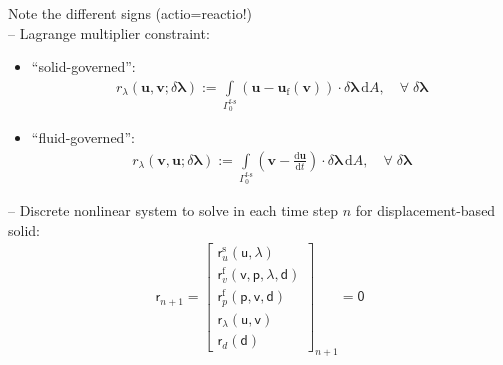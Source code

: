 \documentclass[a4paper,12pt]{report}
\newcommand{\fS}{\text{s}}
\newcommand{\fF}{\text{f}}
\newcommand{\bs}[1]{\boldsymbol{#1}}
\newcommand{\Gm}{\mathit{\Gamma}}
\newcommand{\ROP}{\bs{\mathsf{r}}}
\newcommand{\LM}{\bs{\mathsf{\lambda}}}
\begin{document}
Note the different signs (actio=reactio!)\\

-- Lagrange multiplier constraint:

\begin{itemize}

\item ``solid-governed'':
\begin{equation}
\begin{aligned}
r_{\lambda}(\bs{u},\bs{v};\delta\bs{\lambda}):= \int\limits_{\Gm_0^{\mathrm{\fF\text{-}\fS}}} \left(\bs{u} - \bs{u}_{\mathrm{f}}(\bs{v})\right)\cdot\delta\bs{\lambda}\,\mathrm{d}A, \quad \forall \; \delta\bs{\lambda}
\end{aligned}
\end{equation}

\item ``fluid-governed'':
\begin{equation}
\begin{aligned}
r_{\lambda}(\bs{v},\bs{u};\delta\bs{\lambda}):= \int\limits_{\Gm_0^{\mathrm{\fF\text{-}\fS}}} \left(\bs{v} - \frac{\mathrm{d} \bs{u}}{\mathrm{d} t}\right)\cdot\delta\bs{\lambda}\,\mathrm{d}A, \quad \forall \; \delta\bs{\lambda}
\end{aligned}
\end{equation}

\end{itemize}


-- Discrete nonlinear system to solve in each time step $n$ for displacement-based solid:
\begin{equation}
\label{equation-nonlin-sys-fsi}
\begin{aligned}
\ROP_{n+1} = \begin{bmatrix} \ROP_{u}^{\mathrm{s}}(\bs{\mathsf{u}},\LM) \\ \ROP_{v}^{\mathrm{f}}(\bs{\mathsf{v}},\bs{\mathsf{p}},\LM,\bs{\mathsf{d}}) \\ \ROP_{p}^{\mathrm{f}}(\bs{\mathsf{p}},\bs{\mathsf{v}},\bs{\mathsf{d}}) \\ \ROP_{\lambda}(\bs{\mathsf{u}},\bs{\mathsf{v}}) \\ \ROP_{d}(\bs{\mathsf{d}}) \end{bmatrix}_{n+1} = \bs{\mathsf{0}}
\end{aligned}
\end{equation}
\end{document}
